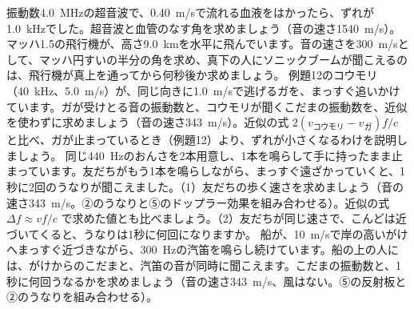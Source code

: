 \bkproblem 振動数\qty{4.0}{MHz}の超音波で、\qty{0.40}{m/s}で流れる血液をはかったら、ずれが\qty{1.0}{kHz}でした。超音波と血管のなす角を求めましょう（音の速さ\qty{1540}{m/s}）。
\bkproblem マッハ1.5の飛行機が、高さ\qty{9.0}{km}を水平に飛んでいます。音の速さを\qty{300}{m/s}として、マッハ円すいの半分の角を求め、真下の人にソニックブームが聞こえるのは、飛行機が真上を通ってから何秒後か求めましょう。
\bkproblem 例題12のコウモリ（\qty{40}{kHz}、\qty{5.0}{m/s}）が、同じ向きに\qty{1.0}{m/s}で逃げるガを、まっすぐ追いかけています。ガが受けとる音の振動数と、コウモリが聞くこだまの振動数を、近似を使わずに求めましょう（音の速さ\qty{343}{m/s}）。近似の式 $2(v_{\text{コウモリ}}-v_{\text{ガ}})f/c$ と比べ、ガが止まっているとき（例題12）より、ずれが小さくなるわけを説明しましょう。
\bkproblem 同じ\qty{440}{Hz}のおんさを2本用意し、1本を鳴らして手に持ったまま止まっています。友だちがもう1本を鳴らしながら、まっすぐ遠ざかっていくと、1秒に2回のうなりが聞こえました。（1）友だちの歩く速さを求めましょう（音の速さ\qty{343}{m/s}。②のうなりと⑤のドップラー効果を組み合わせる）。近似の式 $\Delta f\approx vf/c$ で求めた値とも比べましょう。（2）友だちが同じ速さで、こんどは近づいてくると、うなりは1秒に何回になりますか。
\bkproblem 船が、\qty{10}{m/s}で岸の高いがけへまっすぐ近づきながら、\qty{300}{Hz}の汽笛を鳴らし続けています。船の上の人には、がけからのこだまと、汽笛の音が同時に聞こえます。こだまの振動数と、1秒に何回うなるかを求めましょう（音の速さ\qty{343}{m/s}、風はない。⑤の反射板と②のうなりを組み合わせる）。

